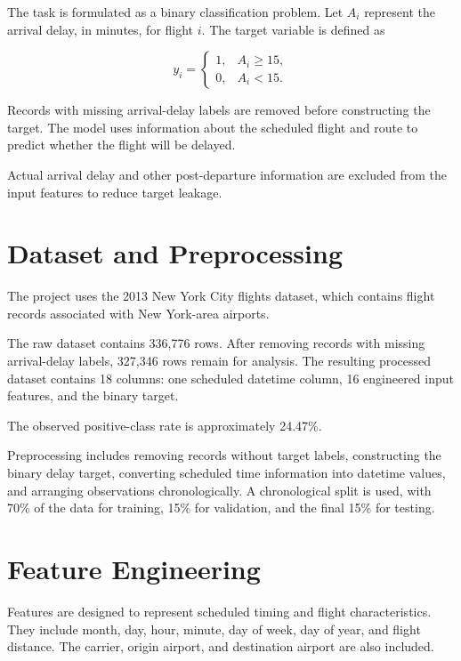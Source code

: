 \documentclass[conference]{IEEEtran}
\begin{document}
The task is formulated as a binary classification problem. Let
$A_i$ represent the arrival delay, in minutes, for flight $i$.
The target variable is defined as

\begin{equation}
y_i =
\begin{cases}
1, & A_i \geq 15,\\
0, & A_i < 15.
\end{cases}
\end{equation}

Records with missing arrival-delay labels are removed before
constructing the target. The model uses information about the
scheduled flight and route to predict whether the flight will be
delayed.

Actual arrival delay and other post-departure information are
excluded from the input features to reduce target leakage.

\section{Dataset and Preprocessing}

The project uses the 2013 New York City flights dataset, which
contains flight records associated with New York-area airports.

The raw dataset contains 336,776 rows. After removing records with
missing arrival-delay labels, 327,346 rows remain for analysis.
The resulting processed dataset contains 18 columns: one scheduled
datetime column, 16 engineered input features, and the binary target.

The observed positive-class rate is approximately 24.47\%.

Preprocessing includes removing records without target labels,
constructing the binary delay target, converting scheduled time
information into datetime values, and arranging observations
chronologically. A chronological split is used, with 70\% of the
data for training, 15\% for validation, and the final 15\% for testing.

\section{Feature Engineering}

Features are designed to represent scheduled timing and flight
characteristics. They include month, day, hour, minute, day of week,
day of year, and flight distance. The carrier, origin airport, and
destination airport are also included.
\end{document}
